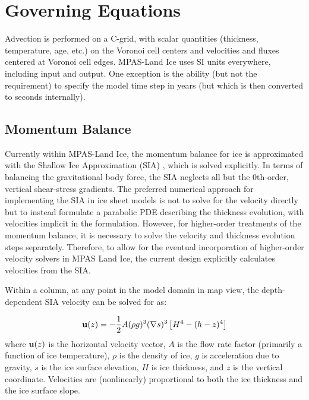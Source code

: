 \chapter{Governing Equations}
\label{chap:landice-intro}



Advection is performed on a C-grid, with scalar quantities (thickness, temperature, age, etc.) on the Voronoi cell centers and velocities and fluxes centered at Voronoi cell edges.  MPAS-Land Ice uses SI units everywhere, including input and output.  One exception is the ability (but not the requirement) to specify the model time step in years (but which is then converted to seconds internally).

\section{Momentum Balance}

Currently within MPAS-Land Ice, the momentum balance for ice is approximated with the Shallow Ice Approximation (SIA) \citep{Hutter1983}, which is solved explicitly.  In terms of balancing the gravitational body force, the SIA neglects all but the 0th-order, vertical shear-stress gradients.  The preferred numerical approach for implementing the SIA in ice sheet models is not to solve for the velocity directly but to instead formulate a parabolic PDE describing the thickness evolution, with velocities implicit in the formulation.  However, for higher-order treatments of the momentum balance, it is necessary to solve the velocity and thickness evolution steps separately. Therefore, to allow for the eventual incorporation of higher-order velocity solvers in MPAS Land Ice, the current design explicitly calculates velocities from the SIA.

Within a column, at any point in the model domain in map view, the depth-dependent SIA velocity can be solved for as:

\begin{equation}
    \label{sia}
	\mathbf{u}(z) = -\frac{1}{2} A (\rho g )^3 (\nabla s)^3 \left[H^4 - (h-z)^4 \right]
\end{equation}
where $\mathbf{u}(z)$ is the horizontal velocity vector, $A$ is the flow rate factor (primarily a function of ice temperature), $\rho$ is the density of ice, $g$ is acceleration due to gravity, $s$ is the ice surface elevation, $H$ is ice thickness, and $z$ is the vertical coordinate. Velocities are (nonlinearly) proportional to both the ice thickness and the ice surface slope.

